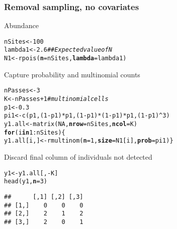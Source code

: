 \documentclass[color=usenames,dvipsnames]{beamer}\usepackage[]{graphicx}\usepackage[]{color}
\makeatletter
\newcommand{\hlnum}[1]{\textcolor[rgb]{0.69,0.494,0}{#1}}%
\newcommand{\hlcom}[1]{\textcolor[rgb]{0.514,0.506,0.514}{\textit{#1}}}%
\newcommand{\hlopt}[1]{\textcolor[rgb]{0,0,0}{#1}}%
\newcommand{\hlstd}[1]{\textcolor[rgb]{0,0,0}{#1}}%
\newcommand{\hlkwa}[1]{\textcolor[rgb]{0,0,0}{\textbf{#1}}}%
\newcommand{\hlkwb}[1]{\textcolor[rgb]{0,0.341,0.682}{#1}}%
\newcommand{\hlkwc}[1]{\textcolor[rgb]{0,0,0}{\textbf{#1}}}%
\newcommand{\hlkwd}[1]{\textcolor[rgb]{0.004,0.004,0.506}{#1}}%
\newenvironment{kframe}{%
 \def\at@end@of@kframe{}%
 \ifinner\ifhmode%
  \def\at@end@of@kframe{\end{minipage}}%
  \begin{minipage}{\columnwidth}%
 \fi\fi%
 \def\FrameCommand##1{\hskip\@totalleftmargin \hskip-\fboxsep
 \colorbox{shadecolor}{##1}\hskip-\fboxsep
     \hskip-\linewidth \hskip-\@totalleftmargin \hskip\columnwidth}%
 \MakeFramed {\advance\hsize-\width
   \@totalleftmargin\z@ \linewidth\hsize
   \@setminipage}}%
 {\par\unskip\endMakeFramed%
 \at@end@of@kframe}
\newenvironment{knitrout}{}{} %
\makeatother
\begin{document}
\begin{frame}[fragile]
  \frametitle{Removal sampling, no covariates}
  \small
  Abundance
\begin{knitrout}\scriptsize
{}\color{fgcolor}\begin{kframe}
\begin{alltt}
\hlstd{nSites} \hlkwb{<-} \hlnum{100}
\hlstd{lambda1} \hlkwb{<-} \hlnum{2.6}  \hlcom{## Expected value of N}
\hlstd{N1} \hlkwb{<-} \hlkwd{rpois}\hlstd{(}\hlkwc{n}\hlstd{=nSites,} \hlkwc{lambda}\hlstd{=lambda1)}
\end{alltt}
\end{kframe}
\end{knitrout}
  \pause
  \vfill
  Capture probability and multinomial counts%
\begin{knitrout}\scriptsize
{}\color{fgcolor}\begin{kframe}
\begin{alltt}
\hlstd{nPasses} \hlkwb{<-} \hlnum{3}
\hlstd{K} \hlkwb{<-} \hlstd{nPasses}\hlopt{+}\hlnum{1}  \hlcom{# multinomial cells}
\hlstd{p1} \hlkwb{<-} \hlnum{0.3}
\hlstd{pi1} \hlkwb{<-} \hlkwd{c}\hlstd{(p1, (}\hlnum{1}\hlopt{-}\hlstd{p1)}\hlopt{*}\hlstd{p1, (}\hlnum{1}\hlopt{-}\hlstd{p1)}\hlopt{*}\hlstd{(}\hlnum{1}\hlopt{-}\hlstd{p1)}\hlopt{*}\hlstd{p1, (}\hlnum{1}\hlopt{-}\hlstd{p1)}\hlopt{^}\hlnum{3}\hlstd{)}
\hlstd{y1.all} \hlkwb{<-} \hlkwd{matrix}\hlstd{(}\hlnum{NA}\hlstd{,} \hlkwc{nrow}\hlstd{=nSites,} \hlkwc{ncol}\hlstd{=K)}
\hlkwa{for}\hlstd{(i} \hlkwa{in} \hlnum{1}\hlopt{:}\hlstd{nSites) \{}
    \hlstd{y1.all[i,]} \hlkwb{<-} \hlkwd{rmultinom}\hlstd{(}\hlkwc{n}\hlstd{=}\hlnum{1}\hlstd{,} \hlkwc{size}\hlstd{=N1[i],} \hlkwc{prob}\hlstd{=pi1)    \}}
\end{alltt}
\end{kframe}
\end{knitrout}
  \pause
  \vfill
  Discard final column of individuals not detected
\begin{knitrout}\scriptsize
{}\color{fgcolor}\begin{kframe}
\begin{alltt}
\hlstd{y1} \hlkwb{<-} \hlstd{y1.all[,}\hlopt{-}\hlstd{K]}
\hlkwd{head}\hlstd{(y1,} \hlkwc{n}\hlstd{=}\hlnum{3}\hlstd{)}
\end{alltt}
\begin{verbatim}
##      [,1] [,2] [,3]
## [1,]    0    0    0
## [2,]    2    1    2
## [3,]    2    0    1
\end{verbatim}
\end{kframe}
\end{knitrout}
\end{frame}
\end{document}
